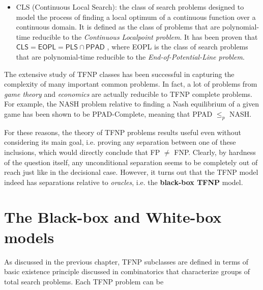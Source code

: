 \begin{itemize}
    \item \textsf{CLS} (Continuous Local Search): the class of search problems designed to model the process of finding a local optimum of a continuous function over a continuous domain. It is defined as the class of problems that are polynomial-time reducible to the \textit{Continuous Localpoint problem}. It has been proven that $\mathsf{CLS} = \mathsf{EOPL} = \mathsf{PLS} \cap \mathsf{PPAD}$ \cite{gradient_descent, Further_collapses_TFNP}, where \textsf{EOPL} is the class of search problems that are polynomial-time reducible to the \textit{End-of-Potential-Line problem}.
\end{itemize}

The extensive study of \textsf{TFNP} classes has been successful in capturing the complexity of many important common problems. In fact, a lot of problems from \textit{game theory} and \textit{economics} are actually reducible to \textsf{TFNP} complete problems. For example, the \textsf{NASH} problem relative to finding a Nash equilibrium of a given game has been shown to be \textsf{PPAD}-Complete, meaning that \textsf{PPAD} $\leq_p$ \textsf{NASH}.

For these reasons, the theory of \textsf{TFNP} problems results useful even without considering its main goal, i.e. proving any separation between one of these inclusions, which would directly conclude that \textsf{FP} $\neq$ \textsf{FNP}. Clearly, by hardness of the question itself, any unconditional separation seems to be completely out of reach just like in the decisional case. However, it turns out that the \textsf{TFNP} model indeed has separations relative to \textit{oracles}, i.e. the \textbf{black-box \textsf{TFNP}} model.
 
\quad

\section{The Black-box and White-box models}

As discussed in the previous chapter, \textsf{TFNP} subclasses are defined in terms of basic existence principle discussed in combinatorics that characterize groups of total search problems. Each \textsf{TFNP} problem can be 

\cleardoublepage